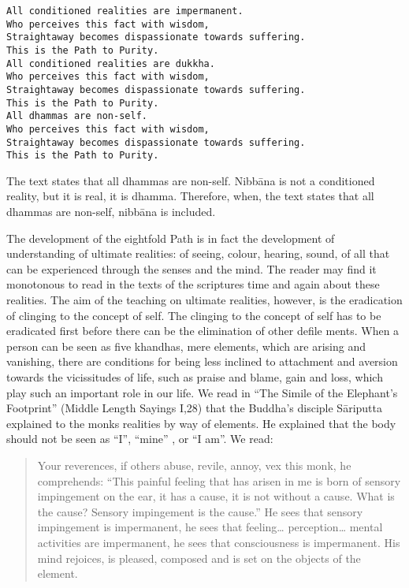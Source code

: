 \documentclass{book}
\begin{document}
\begin{verbatim}
All conditioned realities are impermanent.
Who perceives this fact with wisdom,
Straightaway becomes dispassionate towards suffering.
This is the Path to Purity.
All conditioned realities are dukkha.
Who perceives this fact with wisdom,
Straightaway becomes dispassionate towards suffering.
This is the Path to Purity.
All dhammas are non-self.
Who perceives this fact with wisdom,
Straightaway becomes dispassionate towards suffering.
This is the Path to Purity.
\end{verbatim}

The text states that all dhammas are non-self. Nibbāna is not a
conditioned reality, but it is real, it is dhamma. Therefore, when, the
text states that all dhammas are non-self, nibbāna is included.

The development of the eightfold Path is in fact the development of
understanding of ultimate realities: of seeing, colour, hearing, sound,
of all that can be expe­rienced through the senses and the mind. The
reader may find it monotonous to read in the texts of the scriptures
time and again about these realities. The aim of the teaching on
ultimate realities, however, is the eradication of clinging to the 
concept of self. The clinging to the concept of self has to be 
eradicated first before there can be the elimina­tion of other defile­
ments. When a person can be seen as five khandhas, mere elements, which 
are arising and vanishing, there are conditions for being less inclined 
to attachment and aversion towards the vicissitudes of life, such as 
praise and blame, gain and loss, which play such an important role in 
our life. We read in ``The Simile of the Elephant's Footprint'' (Middle 
Length Sayings I,28) that the Buddha's disciple Sāriputta explained to 
the monks realities by way of elements. He explained that the body 
should not be seen as ``I'', ``mine'' , or ``I am''. We read:

\begin{quote}
Your reverences, if others abuse, revile, annoy, vex this monk, he
comprehends: ``This painful feeling that has arisen in me is born of
sensory impingement on the ear, it has a cause, it is not without a
cause. What is the cause? Sensory impingement is the cause.'' He sees
that sensory impingement is impermanent, he sees that feeling\ldots{}
perception\ldots{} mental activities are impermanent, he sees that
consciousness is impermanent. His mind rejoices, is pleased, composed
and is set on the objects of the element.
\end{quote}
\end{document}
